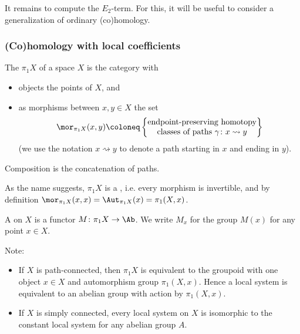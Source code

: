 It remains to compute the $E_2$-term.
For this, it will be useful to consider a generalization of ordinary (co)homology.

\subsubsection{(Co)homology with local coefficients}
\begin{definition}
	The  $\pi_1 X$ of a space $X$ is the category with
	\begin{itemize}
		\item objects the points of $X$, and
		\item as morphisms between $x, y \in X$ the set 
			\begin{equation*}
				\mor_{\pi_1 X}(x, y) \coloneq 
					\begin{Bmatrix}
						\text{endpoint-preserving homotopy} \\ 
						\text{classes of paths } \gamma\colon x \rightsquigarrow y
					\end{Bmatrix}
			\end{equation*}
			(we use the notation $x \rightsquigarrow y$ to denote a path starting in $x$ and ending in $y$).
	\end{itemize}
	Composition is the concatenation of paths.
\end{definition}
As the name suggests, $\pi_1 X$ is a , i.e. every morphism is invertible, and by definition $\mor_{\pi_1 X}(x, x) = \Aut_{\pi_1 X}(x) = \pi_1(X, x)$.
\begin{definition}
	A  on $X$ is a functor $M\colon \pi_1 X \to \Ab$.
	We write $M_x$ for the group $M(x)$ for any point $x \in X$.
\end{definition}
Note:
\begin{itemize}
	\item If $X$ is path-connected, then $\pi_1 X$ is equivalent to the groupoid with one object $x \in X$ and automorphism group $\pi_1(X, x)$.
		Hence a local system is equivalent to an abelian group with action by $\pi_1(X, x)$.
	\item If $X$ is simply connected, every local system on $X$ is isomorphic to the constant local system for any abelian group $A$.
\end{itemize}
